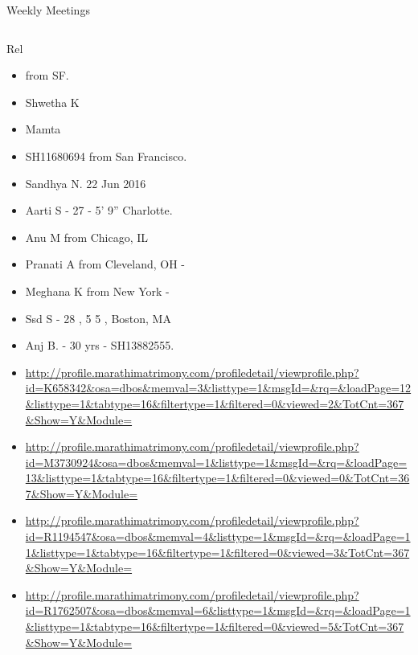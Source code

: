 \documentclass[serif, mathserif, final]{beamer}
\begin{document}
\begin{frame}
\begin{columns}
\begin{column}{0.5\linewidth}
\begin{block}{Weekly Meetings}
\begin{column}{0.25\linewidth}
\begin{block}{Rel}

  \begin{itemize} 
    \small \item \small  from SF. 
    \item \small Shwetha K 
    \item \small Mamta       
    \item \small SH11680694 from San Francisco. 
    \item \small Sandhya N. 22 Jun 2016 
    \item \small Aarti S - 27 - 5' 9'' Charlotte.       
    \item \small Anu M from Chicago, IL 
    \item \small Pranati A from Cleveland, OH - 
    \item \small Meghana K from New York - 
    \item \small Ssd S - 28 , 5 5 , Boston, MA 
    \item \small Anj B. - 30 yrs - SH13882555.
  \end{itemize} 



\begin{itemize}
    \item \small
      \url{http://profile.marathimatrimony.com/profiledetail/viewprofile.php?id=K658342&osa=dbos&memval=3&listtype=1&msgId=&rq=&loadPage=12&listtype=1&tabtype=16&filtertype=1&filtered=0&viewed=2&TotCnt=367&Show=Y&Module=}

\item \small \url{http://profile.marathimatrimony.com/profiledetail/viewprofile.php?id=M3730924&osa=dbos&memval=1&listtype=1&msgId=&rq=&loadPage=13&listtype=1&tabtype=16&filtertype=1&filtered=0&viewed=0&TotCnt=367&Show=Y&Module=}

\item \small \url{http://profile.marathimatrimony.com/profiledetail/viewprofile.php?id=R1194547&osa=dbos&memval=4&listtype=1&msgId=&rq=&loadPage=11&listtype=1&tabtype=16&filtertype=1&filtered=0&viewed=3&TotCnt=367&Show=Y&Module=}

\item \small \url{http://profile.marathimatrimony.com/profiledetail/viewprofile.php?id=R1762507&osa=dbos&memval=6&listtype=1&msgId=&rq=&loadPage=1&listtype=1&tabtype=16&filtertype=1&filtered=0&viewed=5&TotCnt=367&Show=Y&Module=}


\end{itemize}
\end{block}
\end{column}
\end{block}
\end{column}
\end{columns}
\end{frame}
\end{document}

